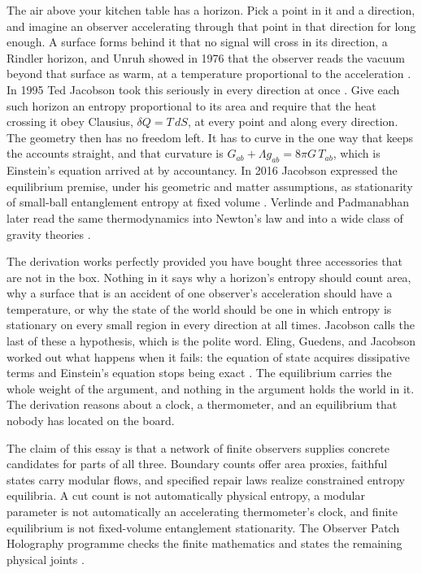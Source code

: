 \documentclass[12pt]{article}
\newcommand{\Gab}{G_{ab}}
\newcommand{\Tab}{T_{ab}}
\begin{document}
\begin{doublespace}
The air above your kitchen table has a horizon. Pick a point in it and a direction, and imagine an observer accelerating through that point in that direction for long enough. A surface forms behind it that no signal will cross in its direction, a Rindler horizon, and Unruh showed in 1976 that the observer reads the vacuum beyond that surface as warm, at a temperature proportional to the acceleration \cite{unruh76}. In 1995 Ted Jacobson took this seriously in every direction at once \cite{jacobson95}. Give each such horizon an entropy proportional to its area and require that the heat crossing it obey Clausius, $\delta Q = T\,dS$, at every point and along every direction. The geometry then has no freedom left. It has to curve in the one way that keeps the accounts straight, and that curvature is $\Gab + \Lambda g_{ab} = 8\pi G\,\Tab$, which is Einstein's equation arrived at by accountancy. In 2016 Jacobson expressed the equilibrium premise, under his geometric and matter assumptions, as stationarity of small-ball entanglement entropy at fixed volume \cite{jacobson16}. Verlinde and Padmanabhan later read the same thermodynamics into Newton's law and into a wide class of gravity theories \cite{verlinde2011,padmanabhan2010}.

The derivation works perfectly provided you have bought three accessories that are not in the box. Nothing in it says why a horizon's entropy should count area, why a surface that is an accident of one observer's acceleration should have a temperature, or why the state of the world should be one in which entropy is stationary on every small region in every direction at all times. Jacobson calls the last of these a hypothesis, which is the polite word. Eling, Guedens, and Jacobson worked out what happens when it fails: the equation of state acquires dissipative terms and Einstein's equation stops being exact \cite{elingguedensjacobson2006}. The equilibrium carries the whole weight of the argument, and nothing in the argument holds the world in it. The derivation reasons about a clock, a thermometer, and an equilibrium that nobody has located on the board.

The claim of this essay is that a network of finite observers supplies concrete candidates for parts of all three. Boundary counts offer area proxies, faithful states carry modular flows, and specified repair laws realize constrained entropy equilibria. A cut count is not automatically physical entropy, a modular parameter is not automatically an accelerating thermometer's clock, and finite equilibrium is not fixed-volume entanglement stationarity. The Observer Patch Holography programme checks the finite mathematics and states the remaining physical joints \cite{ophflagship,ophrepo}.


\end{doublespace}
\end{document}
